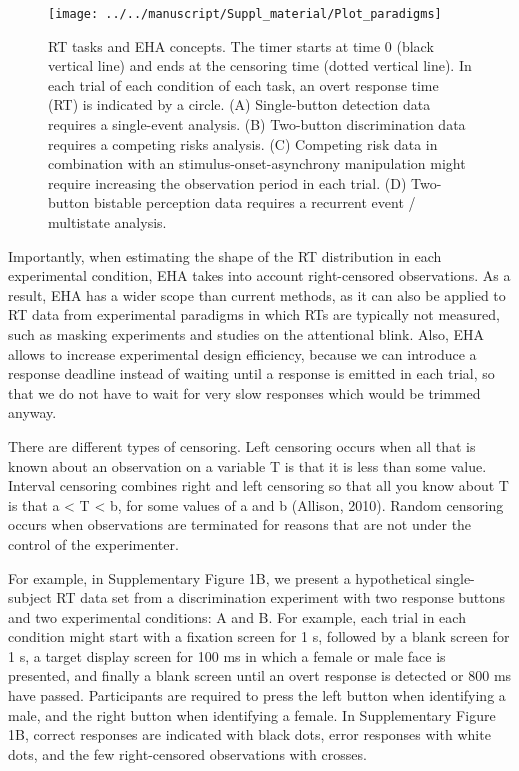 \documentclass[
  man,floatsintext]{apa6}
\begin{document}
\begin{figure}[H]

{\centering \texttt{[image: ../../manuscript/Suppl\_material/Plot\_paradigms]} 

}

\caption{RT tasks and EHA concepts. The timer starts at time 0 (black vertical line) and ends at the censoring time (dotted vertical line). In each trial of each condition of each task, an overt response time (RT) is indicated by a circle. (A) Single-button detection data requires a single-event analysis. (B) Two-button discrimination data requires a competing risks analysis. (C) Competing risk data in combination with an stimulus-onset-asynchrony manipulation might require increasing the observation period in each trial. (D) Two-button bistable perception data requires a recurrent event / multistate analysis.}\label{fig:plot-RT-tasks}
\end{figure}

Importantly, when estimating the shape of the RT distribution in each experimental condition, EHA takes into account right-censored observations. As a result, EHA has a wider scope than current methods, as it can also be applied to RT data from experimental paradigms in which RTs are typically not measured, such as masking experiments and studies on the attentional blink. Also, EHA allows to increase experimental design efficiency, because we can introduce a response deadline instead of waiting until a response is emitted in each trial, so that we do not have to wait for very slow responses which would be trimmed anyway.

There are different types of censoring. Left censoring occurs when all that is known about an observation on a variable T is that it is less than some value. Interval censoring combines right and left censoring so that all you know about T is that a \textless{} T \textless{} b, for some values of a and b (Allison, 2010). Random censoring occurs when observations are terminated for reasons that are not under the control of the experimenter.

For example, in Supplementary Figure 1B, we present a hypothetical single-subject RT data set from a discrimination experiment with two response buttons and two experimental conditions: A and B. For example, each trial in each condition might start with a fixation screen for 1 s, followed by a blank screen for 1 s, a target display screen for 100 ms in which a female or male face is presented, and finally a blank screen until an overt response is detected or 800 ms have passed. Participants are required to press the left button when identifying a male, and the right button when identifying a female. In Supplementary Figure 1B, correct responses are indicated with black dots, error responses with white dots, and the few right-censored observations with crosses.
\end{document}
